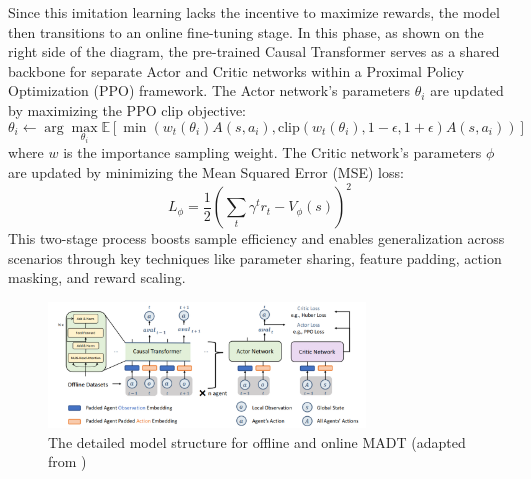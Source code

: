 Since this imitation learning lacks the incentive to maximize rewards, the model then transitions to an online fine-tuning stage. In this phase, as shown on the right side of the diagram, the pre-trained Causal Transformer serves as a shared backbone for separate Actor and Critic networks within a Proximal Policy Optimization (PPO) framework. The Actor network's parameters $\theta_i$ are updated by maximizing the PPO clip objective:
\begin{equation*}
    \theta_i \leftarrow \arg\max_{\theta_i} \mathbb{E}\left[\min\left(w_t(\theta_i) A(s,a_i), \text{clip}(w_t(\theta_i), 1-\epsilon, 1+\epsilon)A(s, a_i)\right)\right]
\end{equation*}
where $w$ is the importance sampling weight. The Critic network's parameters $\phi$ are updated by minimizing the Mean Squared Error (MSE) loss:
\begin{equation}
 \label{eq:madt_loss}
    L_{\phi} = \frac{1}{2} \left( \sum_t \gamma^t r_t - V_{\phi}(s) \right)^2
\end{equation}
This two-stage process boosts sample efficiency and enables generalization across scenarios through key techniques like parameter sharing, feature padding, action masking, and reward scaling.
\begin{figure}[H]
  \centering
 \includegraphics[width=0.75\textwidth]{img_pfe/MADT_arch.PNG}
  \caption{The detailed model structure for offline and online MADT (adapted from \parencite{MADT})}
\label{fig:madt_architecture}
\end{figure}

